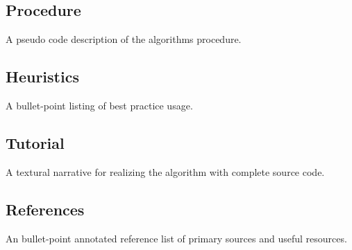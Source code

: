 \subsection{Procedure}
A pseudo code description of the algorithms procedure.

\subsection{Heuristics}
A bullet-point listing of best practice usage.

\subsection{Tutorial}
A textural narrative for realizing the algorithm with complete source code.

\subsection{References}
An bullet-point annotated reference list of primary sources and useful resources.


